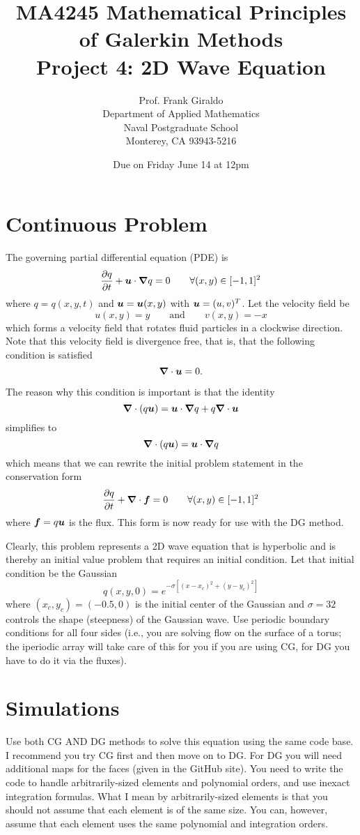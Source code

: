 \documentclass[10pt]{article}
\newcommand{\diff}[2] {\frac{\partial #1}{\partial #2}}
\newcommand{\vc}[1]{\mbox{\boldmath$#1$\unboldmath}}
\newcommand{\grad}{\vc{\nabla}}
\begin{document}
\title{MA4245 Mathematical Principles of Galerkin Methods \\
Project 4: 2D Wave Equation}
\author{Prof. Frank Giraldo \\
Department of Applied Mathematics \\
Naval Postgraduate School \\
Monterey, CA 93943-5216}
\date{Due on Friday June 14 at 12pm}

\maketitle


\section{Continuous Problem}
The governing partial differential equation (PDE) is
\[
\diff{q}{t} + \vc{u} \cdot \grad q = 0 \qquad \forall (x,y) \in [-1,1]^2
\]
where $q=q(x,y,t)$ and $\vc{u}=\vc{u}(x,y)$ with $\vc{u}=(u,v)^T$. Let the velocity field be 
\[
u(x,y)=y \qquad \mathrm{and} \qquad v(x,y)=-x
\]
which forms a velocity field that rotates fluid particles in a clockwise direction. Note that this velocity field is divergence free, that is, 
that the following condition is satisfied
\[
\grad \cdot \vc{u}=0.
\]

The reason why this condition is important is that the identity
\[
\grad \cdot ( q \vc{u} ) = \vc{u} \cdot \grad q + q \grad \cdot \vc{u} 
\]
simplifies to 
\[
\grad \cdot ( q \vc{u} ) = \vc{u} \cdot \grad q
\]
which means that we can rewrite the initial problem statement in the conservation form
\[
\diff{q}{t} + \grad \cdot \vc{f} = 0 \qquad \forall (x,y) \in [-1,1]^2
\]
where $\vc{f}=q \vc{u}$ is the flux. This form is now ready for use with the DG method.

Clearly, this problem represents a 2D wave equation that is hyperbolic and is thereby an initial value problem that requires an initial condition. 
Let that initial condition be the Gaussian
\[
q(x,y,0)= e ^{ - \sigma\left[ (x-x_c)^2 + (y-y_c)^2 \right] }
\]
where $(x_c,y_c)=(-0.5,0)$ is the initial center of the Gaussian and $\sigma=32$ controls the shape (steepness) of the Gaussian wave.
Use periodic boundary conditions for all four sides (i.e., you are solving flow on the surface of a torus; the iperiodic array will take care of this for you if you are using CG, for DG you have to do it via the fluxes).

\section{Simulations}
Use both CG AND DG methods to solve this equation using the same code base. I
recommend you try CG first and then move on to DG. For DG you will
need additional maps 
for the faces (given in the GitHub site). 
You need to write the code to handle arbitrarily-sized elements and polynomial orders, and use inexact integration formulas. What I mean by arbitrarily-sized elements is that you should not assume that each element is of the same size. You can, however, assume that each element uses the same polynomial and integration orders.
\end{document}
